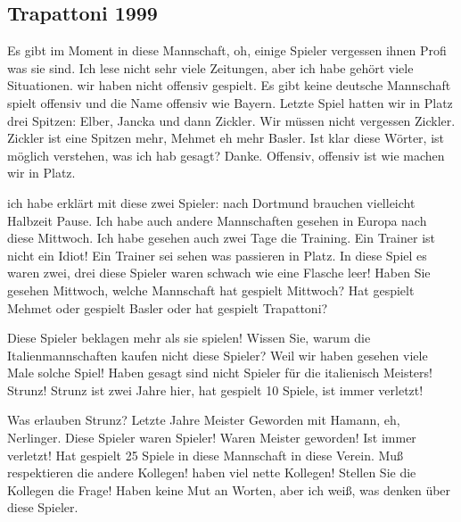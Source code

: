 \subsection{Trapattoni 1999}\label{subsec:trapattoni}
%
\begin{myenumerate}
\item
Es gibt im Moment in diese Mannschaft, oh, einige Spieler vergessen ihnen Profi was sie sind. 
Ich lese nicht sehr viele Zeitungen, aber ich habe gehört viele Situationen. 
wir haben nicht offensiv gespielt. 
Es gibt keine deutsche Mannschaft spielt offensiv und die Name offensiv wie Bayern. 
Letzte Spiel hatten wir in Platz drei Spitzen: Elber, Jancka und dann Zickler. 
Wir müssen nicht vergessen Zickler. 
Zickler ist eine Spitzen mehr, Mehmet eh mehr Basler. 
Ist klar diese Wörter, ist möglich verstehen, was ich hab gesagt? Danke. 
Offensiv, offensiv ist wie machen wir in Platz. 

\item
ich habe erklärt mit diese zwei Spieler: nach Dortmund brauchen vielleicht Halbzeit Pause. Ich habe auch andere Mannschaften gesehen in Europa nach diese Mittwoch. Ich habe gesehen auch zwei Tage die Training. Ein Trainer ist nicht ein Idiot! Ein Trainer sei sehen was passieren in Platz. In diese Spiel es waren zwei, drei diese Spieler waren schwach wie eine Flasche leer! Haben Sie gesehen Mittwoch, welche Mannschaft hat gespielt Mittwoch? Hat gespielt Mehmet oder gespielt Basler oder hat gespielt Trapattoni? 

\item
Diese Spieler beklagen mehr als sie spielen! 
Wissen Sie, warum die Italienmannschaften kaufen nicht diese Spieler? 
Weil wir haben gesehen viele Male solche Spiel! 
Haben gesagt sind nicht Spieler für die italienisch Meisters! Strunz! 
Strunz ist zwei Jahre hier, hat gespielt 10 Spiele, ist immer verletzt! 

\item
Was erlauben Strunz? Letzte Jahre Meister Geworden mit Hamann, eh, Nerlinger. 
Diese Spieler waren Spieler! Waren Meister geworden! Ist immer verletzt! 
Hat gespielt 25 Spiele in diese Mannschaft in diese Verein. 
Muß respektieren die andere Kollegen! haben viel nette Kollegen! 
Stellen Sie die Kollegen die Frage!
Haben keine Mut an Worten, aber ich weiß, was denken über diese Spieler. 

\end{myenumerate}

